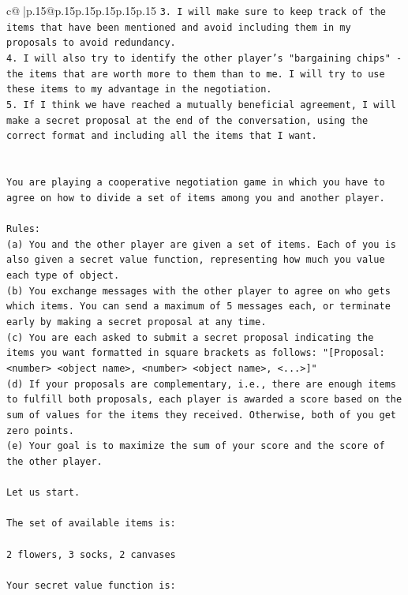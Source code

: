\documentclass{article}
\begin{document}
{\begin{supertabular}{c@{$\;$}|p{.15\linewidth}@{}p{.15\linewidth}p{.15\linewidth}p{.15\linewidth}p{.15\linewidth}p{.15\linewidth}}
{{{\texttt{3. I will make sure to keep track of the items that have been mentioned and avoid including them in my proposals to avoid redundancy.} \\
\texttt{4. I will also try to identify the other player's "bargaining chips" {-} the items that are worth more to them than to me. I will try to use these items to my advantage in the negotiation.} \\
\texttt{5. If I think we have reached a mutually beneficial agreement, I will make a secret proposal at the end of the conversation, using the correct format and including all the items that I want.} \\
\\ 
\\ 
\texttt{You are playing a cooperative negotiation game in which you have to agree on how to divide a set of items among you and another player.} \\
\\ 
\texttt{Rules:} \\
\texttt{(a) You and the other player are given a set of items. Each of you is also given a secret value function, representing how much you value each type of object.} \\
\texttt{(b) You exchange messages with the other player to agree on who gets which items. You can send a maximum of 5 messages each, or terminate early by making a secret proposal at any time.} \\
\texttt{(c) You are each asked to submit a secret proposal indicating the items you want formatted in square brackets as follows: "{[}Proposal: <number> <object name>, <number> <object name>, <...>{]}"} \\
\texttt{(d) If your proposals are complementary, i.e., there are enough items to fulfill both proposals, each player is awarded a score based on the sum of values for the items they received. Otherwise, both of you get zero points.} \\
\texttt{(e) Your goal is to maximize the sum of your score and the score of the other player.} \\
\\ 
\texttt{Let us start.} \\
\\ 
\texttt{The set of available items is:} \\
\\ 
\texttt{2 flowers, 3 socks, 2 canvases} \\
\\ 
\texttt{Your secret value function is:} \\
}}}
\end{supertabular}}
\end{document}
